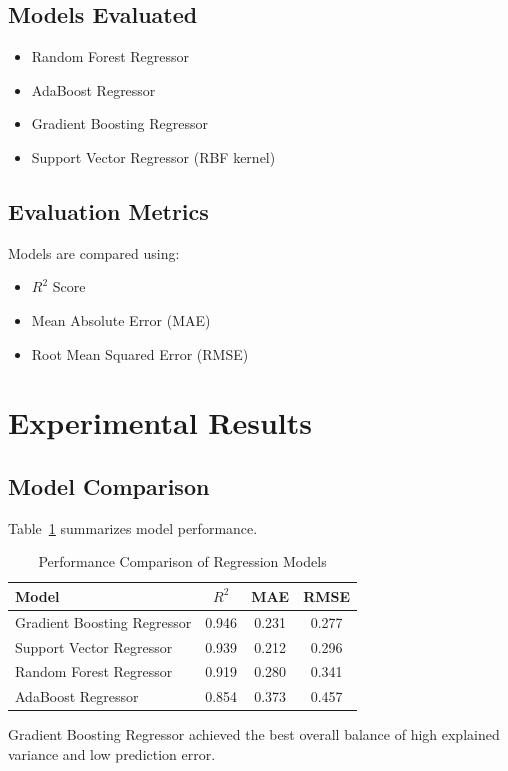 \documentclass[conference]{IEEEtran}
\begin{document}
\subsection{Models Evaluated}
\begin{itemize}
    \item Random Forest Regressor
    \item AdaBoost Regressor
    \item Gradient Boosting Regressor
    \item Support Vector Regressor (RBF kernel)
\end{itemize}

\subsection{Evaluation Metrics}
Models are compared using:
\begin{itemize}
    \item $R^2$ Score
    \item Mean Absolute Error (MAE)
    \item Root Mean Squared Error (RMSE)
\end{itemize}

\section{Experimental Results}

\subsection{Model Comparison}
Table~\ref{tab:performance} summarizes model performance.

\begin{table}[htbp]
\caption{Performance Comparison of Regression Models}
\label{tab:performance}
\centering
\begin{tabular}{lccc}
\toprule
Model & $R^2$ & MAE & RMSE \\
\midrule
Gradient Boosting Regressor & 0.946 & 0.231 & 0.277 \\
Support Vector Regressor    & 0.939 & 0.212 & 0.296 \\
Random Forest Regressor     & 0.919 & 0.280 & 0.341 \\
AdaBoost Regressor          & 0.854 & 0.373 & 0.457 \\
\bottomrule
\end{tabular}
\end{table}

Gradient Boosting Regressor achieved the best overall balance of high explained variance and low prediction error.
\end{document}
